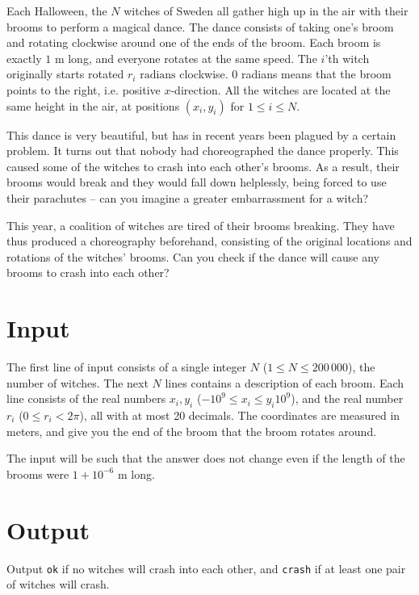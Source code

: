 Each Halloween, the $N$ witches of Sweden all gather high up in the air with their brooms to perform a magical dance.
The dance consists of taking one's broom and rotating clockwise around one of the ends of the broom.
Each broom is exactly $1\text{ m}$ long, and everyone rotates at the same speed.
The $i$'th witch originally starts rotated $r_i\text{ radians}$ clockwise.
0 radians means that the broom points to the right, i.e. positive $x$-direction.
All the witches are located at the same height in the air, at positions $(x_i, y_i)$ for $1 \le i \le N$.

This dance is very beautiful, but has in recent years been plagued by a certain problem.
It turns out that nobody had choreographed the dance properly.
This caused some of the witches to crash into each other's brooms.
As a result, their brooms would break and they would fall down helplessly, being forced to use their parachutes -- can you imagine a greater embarrassment for a witch?

This year, a coalition of witches are tired of their brooms breaking.
They have thus produced a choreography beforehand, consisting of the original locations and rotations of the witches' brooms.
Can you check if the dance will cause any brooms to crash into each other?

\section*{Input}
The first line of input consists of a single integer $N$ ($1 \le N \le 200\,000$), the number of witches.
The next $N$ lines contains a description of each broom.
Each line consists of the real numbers $x_i, y_i$ ($-10^{9} \le x_i \le y_i 10^{9}$), and the real number $r_i$ ($0 \le r_i < 2\pi$), all with at most 20 decimals.
The coordinates are measured in meters, and give you the end of the broom that the broom rotates around.

The input will be such that the answer does not change even if the length of the brooms were $1 + 10^{-6}\text{ m}$ long.

\section*{Output}
Output \texttt{ok} if no witches will crash into each other, and \texttt{crash} if at least one pair of witches will crash.

